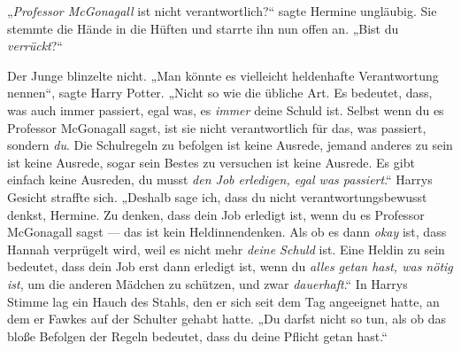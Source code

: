 „\emph{Professor McGonagall} ist nicht verantwortlich?“ sagte Hermine ungläubig. Sie stemmte die Hände in die Hüften und starrte ihn nun offen an.
„Bist du \emph{verrückt}?“

Der Junge blinzelte nicht.
„Man könnte es vielleicht heldenhafte Verantwortung nennen“, sagte Harry Potter.
„Nicht so wie die übliche Art. Es bedeutet, dass, was auch immer passiert, egal was, es \emph{immer} deine Schuld ist. Selbst wenn du es Professor McGonagall sagst, ist sie nicht verantwortlich für das, was passiert, sondern \emph{du}. Die Schulregeln zu befolgen ist keine Ausrede, jemand anderes zu sein ist keine Ausrede, sogar sein Bestes zu versuchen ist keine Ausrede. Es gibt einfach keine Ausreden, du musst \emph{den Job erledigen, egal was passiert}.“ Harrys Gesicht straffte sich.
„Deshalb sage ich, dass du nicht verantwortungsbewusst denkst, Hermine. Zu denken, dass dein Job erledigt ist, wenn du es Professor McGonagall sagst — das ist kein Heldinnendenken. Als ob es dann \emph{okay} ist, dass Hannah verprügelt wird, weil es nicht mehr \emph{deine Schuld} ist. Eine Heldin zu sein bedeutet, dass dein Job erst dann erledigt ist, wenn du \emph{alles getan hast, was nötig ist}, um die anderen Mädchen zu schützen, und zwar \emph{dauerhaft}.“ In Harrys Stimme lag ein Hauch des Stahls, den er sich seit dem Tag angeeignet hatte, an dem er Fawkes auf der Schulter gehabt hatte.
„Du darfst nicht so tun, als ob das bloße Befolgen der Regeln bedeutet, dass du deine Pflicht getan hast.“

